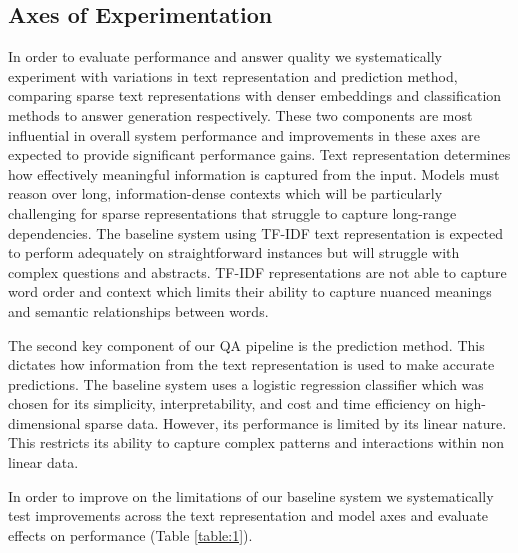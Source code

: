 \documentclass[11pt]{article}
\begin{document}
\subsection{Axes of Experimentation}
In order to evaluate performance and answer quality we systematically experiment with variations in text representation and prediction method, comparing sparse text representations with denser embeddings and classification methods to answer generation respectively. These two components are most influential in overall system performance and improvements in these axes are expected to provide significant performance gains. Text representation determines how effectively meaningful information is captured from the input. Models must reason over long, information-dense contexts which will be particularly challenging for sparse representations that struggle to capture long-range dependencies. The baseline system using TF-IDF text representation is expected to perform adequately on straightforward instances but will struggle with complex questions and abstracts. TF-IDF representations are not able to capture word order and context which limits their ability to capture nuanced meanings and semantic relationships between words. \par
The second key component of our QA pipeline is the prediction method. This dictates how information from the text representation is used to make accurate predictions. The baseline system uses a logistic regression classifier which was chosen for its simplicity, interpretability, and cost and time efficiency on high-dimensional sparse data. However, its performance is limited by its linear nature. This restricts its ability to capture complex patterns and interactions within non linear data. \par
In order to improve on the limitations of our baseline system we systematically test improvements across the text representation and model axes and evaluate effects on performance (Table \ref{table:1}). \par
\end{document}
